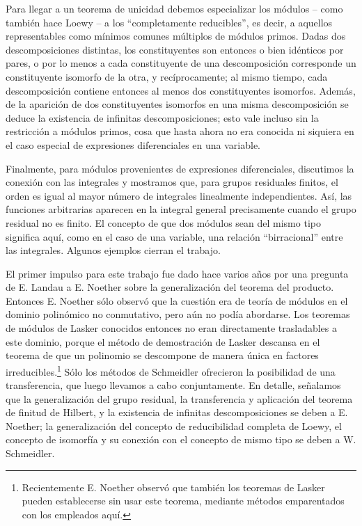 \documentclass[11pt]{article}
\begin{document}
Para llegar a un teorema de unicidad debemos especializar los módulos -- como también hace Loewy -- a los ``completamente reducibles'', es decir, a aquellos representables como mínimos comunes múltiplos de módulos primos. Dadas dos descomposiciones distintas, los constituyentes son entonces o bien idénticos por pares, o por lo menos a cada constituyente de una descomposición corresponde un constituyente isomorfo de la otra, y recíprocamente; al mismo tiempo, cada descomposición contiene entonces al menos dos constituyentes isomorfos. Además, de la aparición de dos constituyentes isomorfos en una misma descomposición se deduce la existencia de infinitas descomposiciones; esto vale incluso sin la restricción a módulos primos, cosa que hasta ahora no era conocida ni siquiera en el caso especial de expresiones diferenciales en una variable.

Finalmente, para módulos provenientes de expresiones diferenciales, discutimos la conexión con las integrales y mostramos que, para grupos residuales finitos, el orden es igual al mayor número de integrales linealmente independientes. Así, las funciones arbitrarias aparecen en la integral general precisamente cuando el grupo residual no es finito. El concepto de que dos módulos sean del mismo tipo significa aquí, como en el caso de una variable, una relación ``birracional'' entre las integrales. Algunos ejemplos cierran el trabajo.

El primer impulso para este trabajo fue dado hace varios años por una pregunta de E. Landau a E. Noether sobre la generalización del teorema del producto. Entonces E. Noether sólo observó que la cuestión era de teoría de módulos en el dominio polinómico no conmutativo, pero aún no podía abordarse. Los teoremas de módulos de Lasker conocidos entonces no eran directamente trasladables a este dominio, porque el método de demostración de Lasker descansa en el teorema de que un polinomio se descompone de manera única en factores irreducibles.\footnote{Recientemente E. Noether observó que también los teoremas de Lasker pueden establecerse sin usar este teorema, mediante métodos emparentados con los empleados aquí.} Sólo los métodos de Schmeidler ofrecieron la posibilidad de una transferencia, que luego llevamos a cabo conjuntamente. En detalle, señalamos que la generalización del grupo residual, la transferencia y aplicación del teorema de finitud de Hilbert, y la existencia de infinitas descomposiciones se deben a E. Noether; la generalización del concepto de reducibilidad completa de Loewy, el concepto de isomorfía y su conexión con el concepto de mismo tipo se deben a W. Schmeidler.
\end{document}

